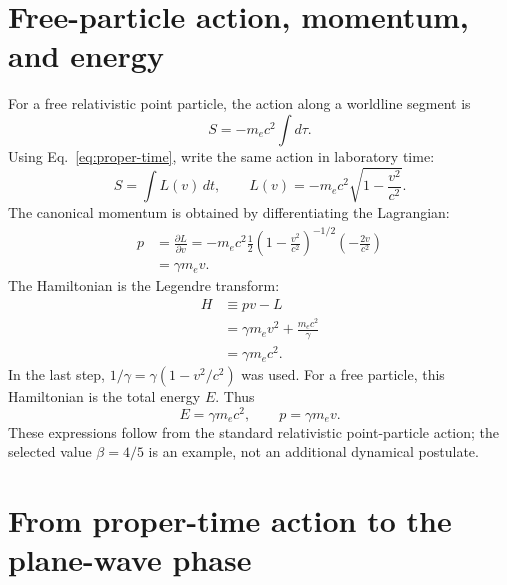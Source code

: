 \documentclass[12pt]{article}
\begin{document}
\section{Free-particle action, momentum, and energy}

For a free relativistic point particle, the action along a worldline segment is
\begin{equation}
  S=-m_ec^2\int d\tau.
  \label{eq:free-action}
\end{equation}
Using Eq.~\eqref{eq:proper-time}, write the same action in laboratory time:
\begin{equation}
  S=\int L(v)\,dt,
  \qquad
  L(v)=-m_ec^2\sqrt{1-\frac{v^2}{c^2}}.
  \label{eq:free-lagrangian}
\end{equation}
The canonical momentum is obtained by differentiating the Lagrangian:
\begin{align}
  p
  &=\frac{\partial L}{\partial v}
   =-m_ec^2\frac{1}{2}
     \left(1-\frac{v^2}{c^2}\right)^{-1/2}
     \left(-\frac{2v}{c^2}\right) \\
  &=\gamma m_ev.
  \label{eq:relativistic-momentum}
\end{align}
The Hamiltonian is the Legendre transform:
\begin{align}
  H&\equiv pv-L \\
   &=\gamma m_ev^2+\frac{m_ec^2}{\gamma} \\
   &=\gamma m_ec^2.
  \label{eq:relativistic-energy}
\end{align}
In the last step, $1/\gamma=\gamma(1-v^2/c^2)$ was used. For a free particle, this Hamiltonian is the total energy $E$. Thus
\begin{equation}
  E=\gamma m_ec^2,
  \qquad
  p=\gamma m_ev.
  \label{eq:E-p-general}
\end{equation}
These expressions follow from the standard relativistic point-particle action; the selected value $\beta=4/5$ is an example, not an additional dynamical postulate.

\section{From proper-time action to the plane-wave phase}
\end{document}
